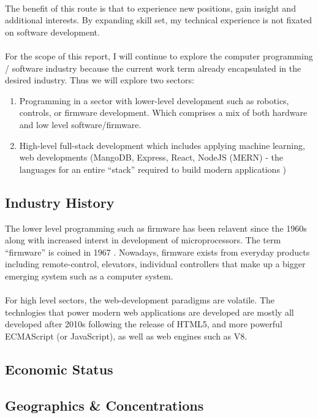 \documentclass[10pt,letterpaper]{article}
\begin{document}
\\
The benefit of this route is that to experience new positions, gain insight and additional interests. By expanding skill set, my technical experience is not fixated on software development.\\
\\
For the scope of this report, I will continue to explore the computer programming / software industry because the current work term already encapsulated in the desired industry\cite{coop-handbook}. Thus we will explore two sectors:
\begin{enumerate}
	\item
	      Programming in a sector with lower-level development such as robotics, controls, or firmware development. Which comprises a mix of both hardware and low level software/firmware.

	\item
	      High-level full-stack development which includes applying machine learning, web developments (MangoDB, Express, React, NodeJS (MERN) - the languages for an entire ``stack'' required to build modern applications \cite{mern})
\end{enumerate}

\subsection{Industry History}
The lower level programming such as firmware has been relavent since the 1960s along with increased interst in development of microprocessors. The term ``firmware'' is coined in 1967 \cite{firmware-term}. Nowadays, firmware exists from everyday products including remote-control, elevators, individual controllers that make up a bigger emerging system such as a computer system.\\
\\
For high level sectors, the web-development paradigms are volatile. The technlogies that power modern web applications are developed are mostly all developed after 2010s following the release of HTML5, and more powerful ECMAScript (or JavaScript), as well as web engines such as V8\cite{html5, ecmascript, v8engine}.\\

\subsection{Economic Status}


\subsection{Geographics \& Concentrations}
\end{document}
